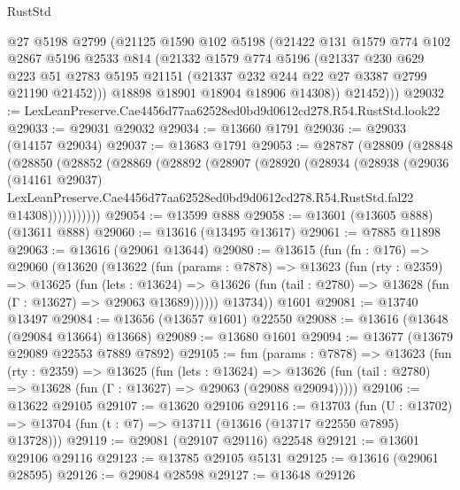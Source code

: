 \begin{lexlean}{RustStd}
\begin{coremodule}
          @27
          @5198
          @2799
          (@21125
            @1590
            @102
            @5198
            (@21422
              @131
              @1579
              @774
              @102
              @2867
              @5196
              @2533
              @814
              (@21332
                @1579
                @774
                @5196
                (@21337
                  @230
                  @629
                  @223
                  @51
                  @2783
                  @5195
                  @21151
                  (@21337 @232 @244 @22 @27 @3387 @2799 @21190 @21452)))
              @18898
              @18901
              @18904
              @18906
              @14308))
          @21452)))
@29032 := LexLeanPreserve.Cae4456d77aa62528ed0bd9d0612cd278.R54.RustStd.look22
@29033 := @29031 @29032
@29034 := @13660 @1791
@29036 := @29033 (@14157 @29034)
@29037 := @13683 @1791
@29053 := @28787
    (@28809
      (@28848
        (@28850
          (@28852
            (@28869
              (@28892
                (@28907
                  (@28920
                    (@28934
                      (@28938
                        (@29036
                          (@14161 @29037)
                          LexLeanPreserve.Cae4456d77aa62528ed0bd9d0612cd278.R54.RustStd.fal22
                          @14308)))))))))))
@29054 := @13599 @888
@29058 := @13601 (@13605 @888) (@13611 @888)
@29060 := @13616 (@13495 @13617)
@29061 := @7885 @11898
@29063 := @13616 (@29061 @13644)
@29080 := @13615
    (fun (fn : @176) =>
    @29060
      (@13620
        (@13622
          (fun (params : @7878) =>
          @13623
            (fun (rty : @2359) =>
            @13625
              (fun (lets : @13624) =>
              @13626 (fun (tail : @2780) => @13628 (fun (Γ : @13627) => @29063 @13689))))))
        @13734))
    @1601
@29081 := @13740 @13497
@29084 := @13656 (@13657 @1601) @22550
@29088 := @13616 (@13648 (@29084 @13664) @13668)
@29089 := @13680 @1601
@29094 := @13677 (@13679 @29089 @22553 @7889 @7892)
@29105 := fun (params : @7878) =>
  @13623
    (fun (rty : @2359) =>
    @13625
      (fun (lets : @13624) =>
      @13626 (fun (tail : @2780) => @13628 (fun (Γ : @13627) => @29063 (@29088 @29094)))))
@29106 := @13622 @29105
@29107 := @13620 @29106
@29116 := @13703
    (fun (U : @13702) => @13704 (fun (t : @7) => @13711 (@13616 (@13717 @22550 @7895) @13728)))
@29119 := @29081 (@29107 @29116) @22548
@29121 := @13601 @29106 @29116
@29123 := @13785 @29105 @5131
@29125 := @13616 (@29061 @28595)
@29126 := @29084 @28598
@29127 := @13648 @29126

\end{coremodule}
\end{lexlean}
